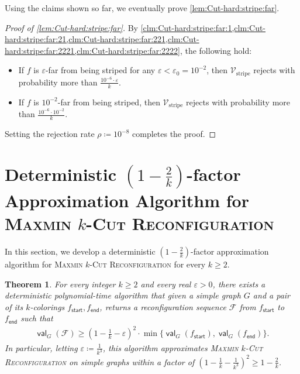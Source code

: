 \documentclass[11pt,fleqn]{article}
\renewcommand{\geq}{\geqslant}
\renewcommand{\epsilon}{\varepsilon}
\newcommand{\prb}[1]{\textsc{#1}\xspace}
\newcommand{\defeq}{\coloneq}
\DeclareMathOperator{\val}{\mathsf{val}}
\newcommand{\sss}{\mathsf{start}}
\newcommand{\ttt}{\mathsf{end}}
\newcommand{\V}{\calV}
\newcommand{\f}{f}
\newcommand{\sqcol}{\scrF}
\newcommand{\rhozero}{10^{-8}}
\newcommand{\epsilonzero}{10^{-2}}
\newcommand{\Vstripe}{\V_\mathrm{stripe}}
\newcommand{\MMkCutReconf}{\prb{Maxmin $k$-Cut Reconfiguration}}
\newcommand{\calV}{\mathcal{V}}
\newcommand{\scrF}{\mathscr{F}}
\newtheorem{theorem}{Theorem}[section]
\theoremstyle{definition}
\numberwithin{equation}{section}
\begin{document}
Using the claims shown so far, we eventually prove \cref{lem:Cut-hard:stripe:far}.


\begin{proof}[Proof of \cref{lem:Cut-hard:stripe:far}]
By \cref{clm:Cut-hard:stripe:far:1,clm:Cut-hard:stripe:far:21,clm:Cut-hard:stripe:far:221,clm:Cut-hard:stripe:far:2221,clm:Cut-hard:stripe:far:2222},
the following hold:
\begin{itemize}
    \item If $\f$ is $\epsilon$-far from being striped for any $\epsilon < \epsilon_0 = \epsilonzero$,
    then $\Vstripe$ rejects with probability more than $\frac{10^{-6} \cdot \epsilon}{k}$.
    \item If $\f$ is $\epsilonzero$-far from being striped,
    then $\Vstripe$ rejects with probability more than $\frac{10^{-6} \cdot \epsilonzero}{k}$.
\end{itemize}
Setting the rejection rate $\rho \defeq \rhozero$ completes the proof.
\end{proof}
 \section{Deterministic $\left(1-\frac{2}{k}\right)$-factor Approximation Algorithm for \MMkCutReconf}
\label{sec:Cut-alg}


In this section, we develop
a deterministic $\left(1-\frac{2}{k}\right)$-factor approximation algorithm for 
\MMkCutReconf for every $k \geq 2$.


\begin{theorem}
\label{thm:Cut-alg}
For every integer $k \geq 2$ and every real $\epsilon > 0$,
there exists a deterministic polynomial-time algorithm that
given a simple graph $G$ and a pair of its $k$-colorings $\f_\sss,\f_\ttt$,
returns a reconfiguration sequence $\sqcol$ from $\f_\sss$ to $\f_\ttt$ such that
\begin{align}
    \val_G(\sqcol) \geq
    \left(1-\frac{1}{k}-\epsilon\right)^2
    \cdot \min\Big\{ \val_G(\f_\sss), \val_G(\f_\ttt) \Bigr\}.
\end{align}
In particular,
letting $\epsilon \defeq \frac{1}{k^3}$,
this algorithm approximates
\MMkCutReconf on simple graphs within a factor of
$\left(1-\frac{1}{k}-\frac{1}{k^3}\right)^2 \geq 1-\frac{2}{k}$.
\end{theorem}
\end{document}
